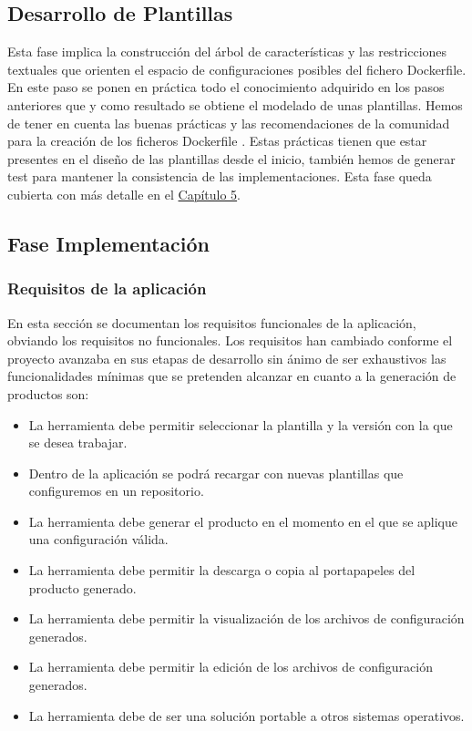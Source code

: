 \documentclass[12pt, a4paper, twoside]{article}
\begin{document}
\subsection{Desarrollo de Plantillas}
Esta fase implica la construcción del árbol de características y las restricciones textuales que orienten el espacio de 
configuraciones posibles del fichero Dockerfile. En este paso se ponen en práctica todo el conocimiento adquirido en los pasos anteriores que 
y como resultado se obtiene el modelado de unas plantillas. Hemos de tener en cuenta las buenas prácticas y las recomendaciones de la comunidad para la creación de los ficheros Dockerfile \cite{Dockerfile_concepts}. 
Estas prácticas tienen que estar presentes en el diseño de las plantillas desde el inicio, también hemos de generar test para mantener la consistencia de las implementaciones. 
Esta fase queda cubierta con más detalle en el \hyperref[sec:Modelado de las plantillas]{Capítulo 5}.


\subsection{Fase Implementación}
\subsubsection{Requisitos de la aplicación }
En esta sección se documentan los requisitos funcionales de la aplicación, obviando los requisitos no funcionales. Los requisitos han cambiado conforme el proyecto avanzaba en sus etapas de desarrollo
sin ánimo de ser exhaustivos las funcionalidades mínimas que se pretenden alcanzar en cuanto a la generación de productos son:
\begin{itemize}
	\item La herramienta debe permitir seleccionar la plantilla y la versión con la que se desea trabajar. 
	\item Dentro de la aplicación se podrá recargar con nuevas plantillas que configuremos en un repositorio.
	\item La herramienta debe generar el producto en el momento en el que se aplique una configuración válida. 
	\item La herramienta debe permitir la descarga o copia al portapapeles del producto generado.
	\item La herramienta debe permitir la visualización de los archivos de configuración generados.
	\item La herramienta debe permitir la edición de los archivos de configuración generados.
	\item La herramienta debe de ser una solución portable a otros sistemas operativos.
\end{itemize}
\end{document}
